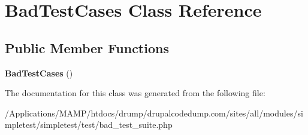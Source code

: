 \hypertarget{class_bad_test_cases}{
\section{BadTestCases Class Reference}
\label{class_bad_test_cases}
}
\subsection*{Public Member Functions}
\begin{DoxyCompactItemize}
\item 
\hypertarget{class_bad_test_cases_acbe631fcb08e31695d7d9c2aab577f9f}{
{\bfseries BadTestCases} ()}
\label{class_bad_test_cases_acbe631fcb08e31695d7d9c2aab577f9f}

\end{DoxyCompactItemize}


The documentation for this class was generated from the following file:\begin{DoxyCompactItemize}
\item 
/Applications/MAMP/htdocs/drump/drupalcodedump.com/sites/all/modules/simpletest/simpletest/test/bad\_\-test\_\-suite.php\end{DoxyCompactItemize}
